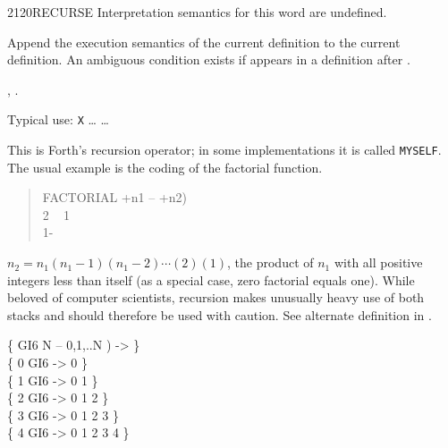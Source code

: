 \begin{worddef}{2120}{RECURSE}
\interpret
	Interpretation semantics for this word are undefined.

\compile
	\stack{}{}

	Append the execution semantics of the current definition to
	the current definition. An ambiguous condition exists if
	 appears in a definition after .

\see {},
	.

	\begin{defer}
	\rationale %
		Typical use:
			\word{:} \texttt{X} {\ldots}  {\ldots} \word{;}

		This is Forth's recursion operator; in some implementations it
		is called \texttt{MYSELF}. The usual example is the coding of
		the factorial function.

		\begin{quote}\ttfamily
		\word{:} FACTORIAL  +n1 -- +n2) \\
		\tab {} 2  ~
				 1 ~
			 \\
		\tab {} 1- ~~ \word{*} \\
		\word{;}
		\end{quote}

		$n_2 = n_1(n_1-1)(n_1-2)\cdots(2)(1)$, the product of $n_1$
		with all positive integers less than itself (as a special case,
		zero factorial equals one). While beloved of computer scientists,
		recursion makes unusually heavy use of both stacks and should
		therefore be used with caution. See alternate definition in
		.

	\testing
		\{ \word{:} GI6  N -- 0,1,..N )  
			    
		 \word{;} -> \} \\
		\{ 0 GI6 -> 0 \} \\
		\{ 1 GI6 -> 0 1 \} \\
		\{ 2 GI6 -> 0 1 2 \} \\
		\{ 3 GI6 -> 0 1 2 3 \} \\
		\{ 4 GI6 -> 0 1 2 3 4 \}
	\end{defer}
\end{worddef}



